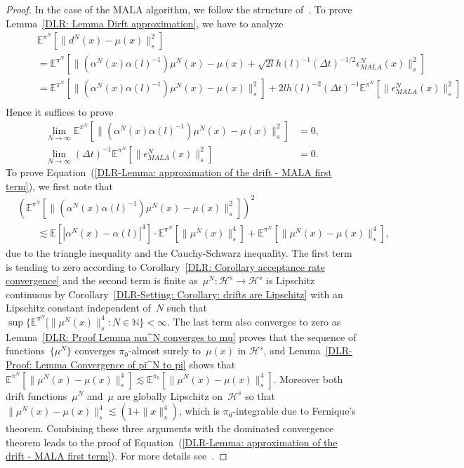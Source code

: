 \begin{proof}
 In the case of the MALA algorithm, we follow the structure of~\autocite[Lemma 4.7]{Pillai2012}. To prove Lemma~\ref{DLR: Lemma Dirft approximation}, we have to analyze
 \begin{align*}
    & \mathbb{E}^{\pi^N}[ \|  d^N(x) - \mu(x) \|_{s}^2 ] \\
    \qquad & =  \mathbb{E}^{\pi^N}[ \|  ( \alpha^N(x) \alpha(l)^{-1} ) \mu^N(x) - \mu(x)+ \sqrt{2l}h(l)^{-1} (\Delta t)^{-1/2} \epsilon_{MALA}^N (x) \|_{s}^2 ] \\
    \qquad & = \mathbb{E}^{\pi^N}[ \|  ( \alpha^N(x) \alpha(l)^{-1} ) \mu^N(x) - \mu(x)\|_{s}^2]  + 2lh(l)^{-2} (\Delta t)^{-1} \mathbb{E}^{\pi^N}[ \| \epsilon_{MALA}^N (x) \|_{s}^2 ] \\
 \end{align*}
 Hence it suffices to prove
 \begin{align}
   \label{DLR-Lemma: approximation of the drift - MALA first term}
   \lim_{N \to \infty} \mathbb{E}^{\pi^N}[ \|  ( \alpha^N(x) \alpha(l)^{-1} ) \mu^N(x) - \mu(x)\|_{s}^2] & = 0, \\
   \label{DLR-Lemma: approximation of the drift - MALA second term}
   \lim_{N \to \infty} (\Delta t)^{-1} \mathbb{E}^{\pi^N}[ \| \epsilon_{MALA}^N (x) \|_{s}^2 ] & = 0.
 \end{align}
 To prove Equation~(\ref{DLR-Lemma: approximation of the drift - MALA first term}), we first note that 
 \begin{align*}
  & \left( \mathbb{E}^{\pi^N}[ \|  ( \alpha^N(x) \alpha(l)^{-1} ) \mu^N(x) - \mu(x)\|_{s}^2] \right)^2 \\
  & \qquad \lesssim \mathbb{E}[|\alpha^N(x) - \alpha(l)|^4] \cdot  \mathbb{E}^{\pi^N}[ \|  \mu^N(x) \|_{s}^4] +  \mathbb{E}^{\pi^N}[ \|  \mu^N(x) - \mu(x)\|_{s}^4],
 \end{align*}
 due to the triangle inequality and the Cauchy-Schwarz inequality. The first term is tending to zero according to Corollary~\ref{DLR: Corollary acceptance rate convergence} and the second term is finite as~$\mu^N : \mathcal{H}^s \to \mathcal{H}^s$ is Lipschitz continuous by Corollary~\ref{DLR-Setting: Corollary: drifts are Lipschitz} with an Lipschitz constant independent of~$N$ such that $\sup \{  \mathbb{E}^{\pi^N}[\| \mu^N(x) \|_s^4: N \in \mathbb{N} \} < \infty$. The last term also converges to zero as Lemma~\ref{DLR: Proof Lemma mu^N converges to mu} proves that the sequence of functions~$\{ \mu^N \}$ converges $\pi_0$-almost surely to~$\mu(x)$ in $\mathcal{H}^s$, and Lemma~\ref{DLR-Proof: Lemma Convergence of pi^N to pi} shows that $ \mathbb{E}^{\pi^N}[ \|  \mu^N(x) - \mu(x)\|_{s}^4] \lesssim  \mathbb{E}^{\pi_0}[ \|  \mu^N(x) - \mu(x)\|_{s}^4]$. Moreover both drift functions~$\mu^N$ and~$\mu$ are globally Lipschitz on~$\mathcal{H}^s$ so that $ \| \mu^N(x) - \mu(x) \|_s^4 \lesssim (1+\|x\|_s^4) $, which is $\pi_0$-integrable due to Fernique's theorem. Combining these three arguments with the dominated convergence theorem leads to the proof of Equation~(\ref{DLR-Lemma: approximation of the drift - MALA first term}). For more details see~\autocite[Lemma 4.7]{Pillai2012}.
 

\end{proof}
